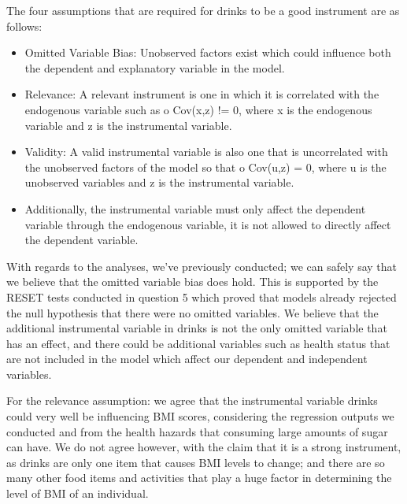 
\vspace{-1em}



The four assumptions that are required for drinks to be a good instrument are as follows: 

\begin{itemize}
    \item Omitted Variable Bias: Unobserved factors exist which could influence both the dependent and explanatory variable in the model. 
    \item Relevance: A relevant instrument is one in which it is correlated with the endogenous variable such as o Cov(x,z) != 0, where x is the endogenous variable and z is the instrumental variable. 
    \item Validity: A valid instrumental variable is also one that is uncorrelated with the unobserved factors of the model so that o Cov(u,z) = 0, where u is the unobserved variables and z is the instrumental variable. 
    \item Additionally, the instrumental variable must only affect the dependent variable through the endogenous variable, it is not allowed to directly affect the dependent variable.
\end{itemize}

\newpage


With regards to the analyses, we've previously conducted; we can safely say that we believe that the omitted variable bias does hold. This is supported by the RESET tests conducted in question 5 which proved that models already rejected the null hypothesis that there were no omitted variables. We believe that the additional instrumental variable in drinks is not the only omitted variable that has an effect, and there could be additional variables such as health status that are not included in the model which affect our dependent and independent variables.

For the relevance assumption: we agree that the instrumental variable drinks could very well be influencing BMI scores, considering the regression outputs we conducted and from the health hazards that consuming large amounts of sugar can have. We do not agree however, with the claim that it is a strong instrument, as drinks are only one item that causes BMI levels to change; and there are so many other food items and activities that play a huge factor in determining the level of BMI of an individual. 

